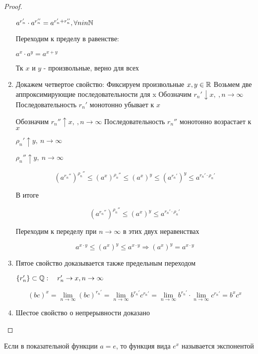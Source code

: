 \begin{proof}
\begin{enumerate}
    $a^{r_n'}\cdot a^{r_n''} = a^{r_n' + r_n''}, \forall n in \mathbb{N}$
    
    Переходим к пределу в равенстве:
    
    $a^{x}\cdot a^{y} = a^{x + y}$
    
    Тк $x$ и $y$ - произвольные, верно для всех

    \item Докажем четвертое свойство:
    Фиксируем произвольные $x,y \in \mathbb{R}$
    Возьмем две аппроксимирующие последовательности для x \newline
    Обозначим $r_{n}' \downarrow x, \ , n \to \infty$ Последовательность $r_n'$ монотонно убывает к $x$
    
    Обозначим $r_{n}'' \uparrow x, \ , n \to \infty$ Последовательность $r_n''$ монотонно возрастает к $x$
    
    $\rho_{n}' \uparrow y, \ n \to \infty$
    
    $\rho_{n}'' \uparrow y, \ n \to \infty$
    
    $$(a^{r_{n}''})^{\rho_{n}''} \leq (a^{x})^{\rho_{n}''} \leq (a^{x})^{y} \leq (a^{r_{n}'})^{y} \leq a^{r_{n}' \cdot \rho_{n}'}$$
    
    В итоге 
    
    $$(a^{r_{n}''})^{\rho_{n}''} \leq (a^{x})^{y} \leq a^{r_{n}' \cdot \rho_{n}'}$$
    
    Переходим к переделу при $n \to \infty$ в этих двух неравенствах
    
    $$a^{x \cdot y} \leq (a^{x})^{y} \leq a^{x \cdot y} \Rightarrow (a^{x})^{y} = a^{x \cdot y}$$

    \item Пятое свойство доказывается также предельным переходом

    $\{r_{n}'\} \subset \mathbb{Q} : \quad r_{n}' \to x, n \to \infty$
    
    $$(bc)^x = \lim\limits_{n \to \infty} (bc)^{r_n'} = \lim\limits_{n \to \infty} b^{r_n'}c^{r_n'} = \lim\limits_{n \to \infty} b^{r_n'} \cdot \lim\limits_{n \to \infty} c^{r_n'} = b^x c^x$$

    \item Шестое свойство о непрерывности доказано

\end{enumerate}
\end{proof}

\begin{definition}
Если в показательной функции $a = e$, то функция вида $e^x$ называется экспонентой
\end{definition}

